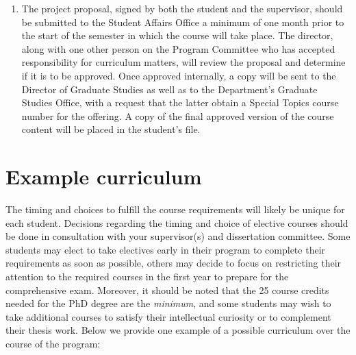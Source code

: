\documentclass[
  openany]{book}
\providecommand{\tightlist}{%
  \setlength{\itemsep}{0pt}\setlength{\parskip}{0pt}}
\begin{document}
\begin{enumerate}
\def\labelenumi{\arabic{enumi}.}
\setcounter{enumi}{2}
\tightlist
\item
  The project proposal, signed by both the student and the supervisor, should be submitted to the Student Affairs Office a minimum of one month prior to the start of the semester in which the course will take place. The director, along with one other person on the Program Committee who has accepted responsibility for curriculum matters, will review the proposal and determine if it is to be approved. Once approved internally, a copy will be sent to the Director of Graduate Studies as well as to the Department's Graduate Studies Office, with a request that the latter obtain a Special Topics course number for the offering. A copy of the final approved version of the course content will be placed in the student's file.
\end{enumerate}

\hypertarget{example-curriculum}{%
\section{Example curriculum}\label{example-curriculum}}

The timing and choices to fulfill the course requirements will likely be unique for each student. Decisions regarding the timing and choice of elective courses should be done in consultation with your supervisor(s) and dissertation committee. Some students may elect to take electives early in their program to complete their requirements as soon as possible, others may decide to focus on restricting their attention to the required courses in the first year to prepare for the comprehensive exam. Moreover, it should be noted that the 25 course credits needed for the PhD degree are the \emph{minimum}, and some students may wish to take additional courses to satisfy their intellectual curiosity or to complement their thesis work. Below we provide one example of a possible curriculum over the course of the program:
\end{document}
